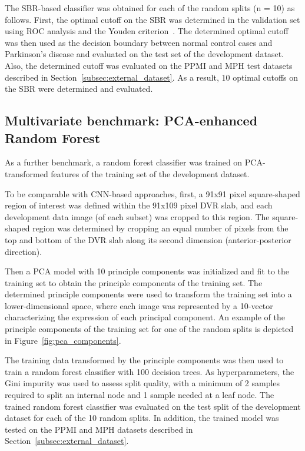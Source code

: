 The SBR-based classifier was obtained for each of the random splits (n = 10) as follows.
First, the optimal cutoff on the SBR was determined in the validation set
using ROC analysis and the Youden criterion~\citep{Youden1950}.
The determined optimal cutoff was then used as the decision boundary between normal control cases and Parkinson's disease 
and evaluated on the test set of the development dataset.
Also, the determined cutoff was evaluated on the PPMI and MPH test datasets described in Section~\ref{subsec:external_dataset}.
As a result, 10 optimal cutoffs on the SBR were determined and evaluated.

\subsection{Multivariate benchmark: PCA-enhanced Random Forest}
\label{subsec:pca_rfc}

As a further benchmark, a random forest classifier was trained on PCA-transformed features of the training set 
of the development dataset.

To be comparable with CNN-based approaches, first, a 91x91 pixel square-shaped region of interest 
was defined within the 91x109 pixel DVR slab, and each development data image (of each subset) was cropped to this region.
The square-shaped region was determined by cropping an equal number of pixels from the top and bottom 
of the DVR slab along its second dimension (anterior-posterior direction).

Then a PCA model with 10 principle components was initialized and fit to the training set to obtain 
the principle components of the training set.
The determined principle components were used to transform the training set into a lower-dimensional space,
where each image was represented by a 10-vector characterizing the expression of each principal component.
An example of the principle components of the training set for one of the random splits is depicted in Figure~\ref{fig:pca_components}.

The training data transformed by the principle components was then used to train a random forest classifier with 100 decision trees.
As hyperparameters, the Gini impurity was used to assess split quality, 
with a minimum of 2 samples required to split an internal node and 1 sample needed at a leaf node.
The trained random forest classifier was evaluated on the test split of the development dataset for each of the 10 random splits.
In addition, the trained model was tested on the PPMI and MPH datasets described in Section~\ref{subsec:external_dataset}.


